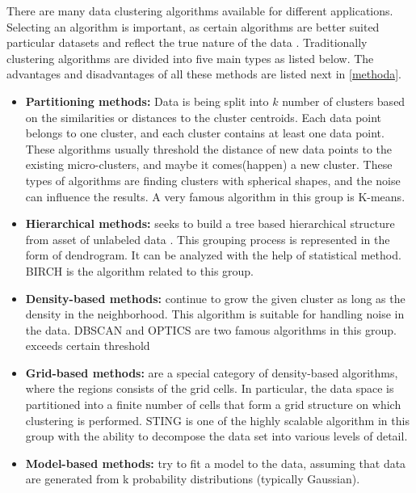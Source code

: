 \documentclass[../UNBThesis2.tex]{subfiles}
\begin{document}
There are many data clustering algorithms available for different applications. Selecting an algorithm is important, as certain algorithms are better suited particular datasets and reflect the true nature of the data \cite{berkhin2006survey, han2011data}. Traditionally clustering algorithms are divided into five main types as listed below. The advantages and disadvantages of all these methods are listed next in \ref{methoda}.

\begin{itemize}

    \item\textbf{Partitioning methods:} Data is being split into $k$ number of clusters based on the similarities or distances to the cluster centroids. Each data point belongs to one cluster, and each cluster contains at least one data point. These algorithms usually threshold the distance of new data points to the existing micro-clusters, and maybe it comes(happen) a new cluster. These types of algorithms are finding clusters with spherical shapes, and the noise can influence the results. A very famous algorithm in this group is K-means.
    
    \item\textbf{Hierarchical methods:} seeks to build a tree based hierarchical structure from asset of unlabeled data \cite{swarndeep2016overview}. This grouping process is represented in the form of dendrogram. It can be analyzed with the help of statistical method. BIRCH is the algorithm related to this group.
    \item\textbf{Density-based methods:} continue to grow the given cluster as long as the density in the neighborhood. This algorithm is suitable for handling noise in the data. DBSCAN and OPTICS are two famous algorithms in this group. 
exceeds certain threshold
    \item\textbf{Grid-based methods:} are a special category of density-based algorithms, where the regions consists of the grid cells. In particular, the data space is partitioned into a finite number of cells that form a grid structure on which clustering is performed. STING is one of the highly scalable algorithm in this group with the ability to decompose the data set into various levels of detail. 
    \item\textbf{Model-based methods:} try to fit a model to the data, assuming that data are generated from k probability distributions (typically Gaussian).
\end{itemize}
\end{document}
